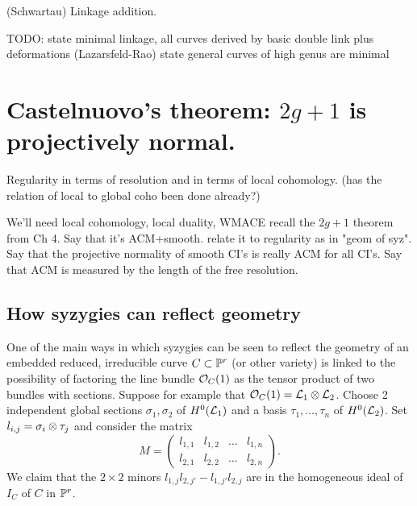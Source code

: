 \begin{exercise} (Schwartau) Linkage addition. 
 
\end{exercise}


TODO:
state minimal linkage, all curves derived by basic double link plus deformations (Lazarsfeld-Rao)
state general curves of high genus are minimal




\section{Castelnuovo's theorem: $2g+1$ is projectively normal.}


 Regularity in terms of resolution and in terms of local cohomology. (has the relation of local to global coho been done already?)

We'll need local cohomology, local duality, 
 WMACE
recall the $2g+1$ theorem from Ch 4. Say that it's ACM+smooth. relate it to regularity as in "geom of syz". Say that the projective
normality of smooth CI's is really ACM for all CI's. Say that ACM is measured by the length of the free resolution.




\subsection{How syzygies can reflect geometry}

One of the main ways in which syzygies can be seen to reflect the geometry of an embedded  reduced, irreducible curve $C\subset \PP^r$
(or other variety) is linked to the possibility of factoring the line bundle $\sO_C(1)$ as the tensor product of two bundles with sections. Suppose for example that $\sO_C(1) = \sL_1\otimes \sL_2$. Choose 2 independent global sections
$\sigma_1, \sigma_2$ of  $H^0(\sL_1)$ and a basis $\tau_1,\dots, \tau_n$ of $H^0(\sL_2)$. Set
$l_{i,j}= \sigma_i\tensor \tau_j$ and consider the matrix 
$$
M = 
\begin{pmatrix}
 l_{1,1}&l_{1,2}&\dots&l_{1,n}\\
  l_{2,1}&l_{2,2}&\dots&l_{2,n}
\end{pmatrix}.
$$
We claim that  the $2\times 2$ minors $l_{1,j} l_{2,j'}-l_{1,j'}l_{2,j}$ are in the homogeneous ideal of $I_C$ of $C$ in $\PP^r$. 

